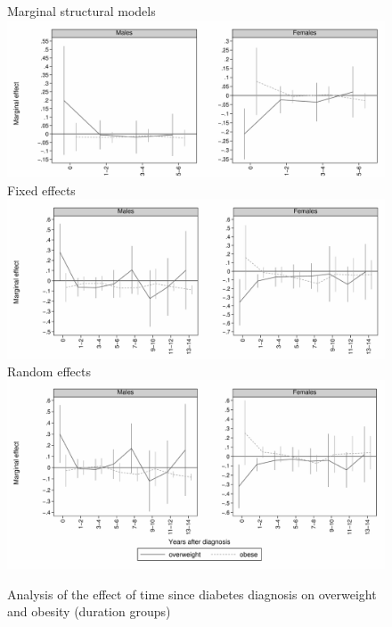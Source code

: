 \begin{figure}
\begin{center}
\caption{\label{fig:obesity_duration_g} Analysis of the effect of time since diabetes diagnosis on overweight and obesity (duration groups)}
Marginal structural models
\includegraphics[width=\linewidth]{Chapter5/Figures/mi_msm_l_all_obese.pdf}
Fixed effects
\includegraphics[width=\linewidth]{Chapter5/Figures/mi_obese_fe.pdf}
Random effects
\includegraphics[width=\linewidth]{Chapter5/Figures/mi_obese_re.pdf}
\end{center}
\end{figure}
\clearpage